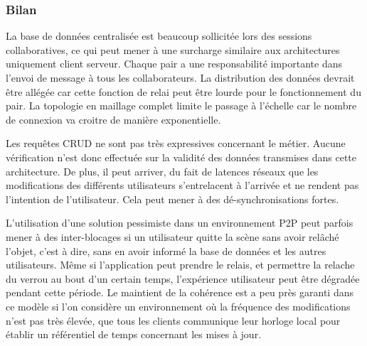 \subsubsection{Bilan}

La base de données centralisée est beaucoup sollicitée lors des sessions 
collaboratives, ce qui peut mener à une surcharge similaire aux architectures 
uniquement client serveur. 
Chaque pair a une responsabilité importante dans l'envoi de message à tous les 
collaborateurs. La distribution des données devrait être allégée car cette fonction 
de relai peut être lourde pour le fonctionnement du pair. 
La topologie en maillage complet limite le passage à l'échelle car le nombre de 
connexion va croitre de manière exponentielle. 

Les requêtes \gls{CRUD} ne sont pas très expressives concernant le métier. 
Aucune vérification n'est donc effectuée sur la validité des données transmises 
dans cette architecture. De plus, il peut arriver, du fait de latences réseaux que les 
modifications des différents utilisateurs s'entrelacent à l'arrivée et ne rendent pas 
l'intention de l'utilisateur. Cela peut mener à des dé-synchronisations fortes.

L'utilisation d'une solution pessimiste dans un environnement \gls{P2P} peut 
parfois mener à des inter-blocages si un utilisateur quitte la scène sans avoir 
relâché l'objet, c'est à dire, sans en avoir informé la base de données et les autres 
utilisateurs. Même si l'application peut prendre le relais, et permettre la relache du 
verrou au bout d'un certain temps, l'expérience utilisateur peut être dégradée 
pendant cette période.
Le maintient de la cohérence est a peu près garanti dans ce modèle si l'on 
considère un environnement où la fréquence des modifications n'est pas très 
élevée, que tous les clients communique leur horloge local pour établir un 
référentiel de temps concernant les mises à jour. 
%
